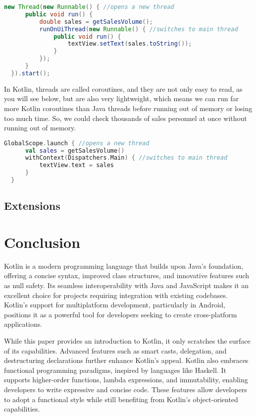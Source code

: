 \documentclass[a4paper,11pt]{article}
\begin{document}
  \begin{lstlisting}[language=Java, title={Java Background Threads}]
  new Thread(new Runnable() { //opens a new thread
      public void run() {
          double sales = getSalesVolume();
          runOnUiThread(new Runnable() { //switches to main thread
              public void run() {
                  textView.setText(sales.toString());
              }
          });
      }
  }).start();
  \end{lstlisting}
  In Kotlin, threads are called coroutines, and they are not only easy to read, as you will see below, but are also very lightweight, which means we can run far more Kotlin coroutines than Java threads before running out of memory or losing too much time.
  So, we could check thousands of sales personnel at once without running out of memory.
  \begin{lstlisting}[language = Kotlin, title = Kotlin Coroutines]
  GlobalScope.launch { //opens a new thread
      val sales = getSalesVolume() 
      withContext(Dispatchers.Main) { //switches to main thread
          textView.text = sales 
      }
  }
  \end{lstlisting}

\subsection{Extensions}


\section{Conclusion}
Kotlin is a modern programming language that builds upon Java's foundation, offering a concise syntax, improved class structures, and innovative features such as null safety. Its seamless interoperability with Java and JavaScript makes it an excellent choice for projects requiring integration with existing codebases. Kotlin's support for multiplatform development, particularly in Android, positions it as a powerful tool for developers seeking to create cross-platform applications.

While this paper provides an introduction to Kotlin, it only scratches the surface of its capabilities. Advanced features such as smart casts, delegation, and destructuring declarations further enhance Kotlin's appeal.
Kotlin also embraces functional programming paradigms, inspired by languages like Haskell. It supports higher-order functions, lambda expressions, and immutability, enabling developers to write expressive and concise code. These features allow developers to adopt a functional style while still benefiting from Kotlin's object-oriented capabilities.
\end{document}
